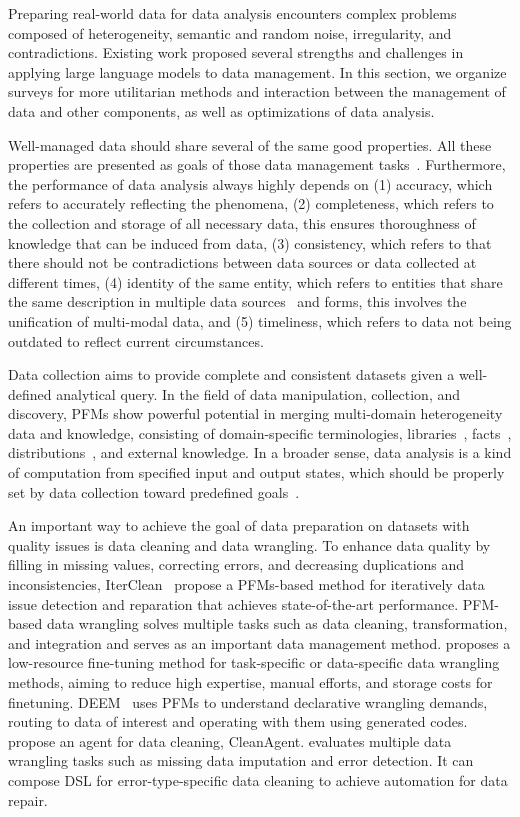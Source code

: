   Preparing real-world data for data analysis encounters complex problems composed of heterogeneity, semantic and random noise, irregularity, and contradictions. Existing work\cite{fernandez2023large} proposed several strengths and challenges in applying large language models to data management. In this section, we organize surveys for more utilitarian methods and interaction between the management of data and other components, as well as optimizations of data analysis. 
  
  
  Well-managed data should share several of the same good properties. All these properties are presented as goals of those data management tasks~\cite{wang1996beyond}. Furthermore, the performance of data analysis always highly depends on (1) accuracy, which refers to accurately reflecting the phenomena, (2) completeness, which refers to the collection and storage of all necessary data, this ensures thoroughness of knowledge that can be induced from data, (3) consistency, which refers to that there should not be contradictions between data sources or data collected at different times, (4) identity of the same entity, which refers to entities that share the same description in multiple data sources~\cite{khoshafian1986object} and forms, this involves the unification of multi-modal data, and (5) timeliness, which refers to data not being outdated to reflect current circumstances. 
  
  Data collection aims to provide complete and consistent datasets given a well-defined analytical query. In the field of data manipulation, collection, and discovery, PFMs show powerful potential in merging multi-domain heterogeneity data and knowledge, consisting of domain-specific terminologies, libraries~\cite{Ellis2020DreamCoderGG}, facts~\cite{Tang2024WorldCoderAM}, distributions~\cite{sordoni2024joint}, and external knowledge. In a broader sense, data analysis is a kind of computation from specified input and output states, which should be properly set by data collection toward predefined goals~\cite{turing1936computable}.
  
  
  An important way to achieve the goal of data preparation on datasets with quality issues is data cleaning and data wrangling. To enhance data quality by filling in missing values, correcting errors, and decreasing duplications and inconsistencies, IterClean~\cite{ni2024iterclean} propose a PFMs-based method for iteratively data issue detection and reparation that achieves state-of-the-art performance. PFM-based data wrangling solves multiple tasks such as data cleaning, transformation, and integration and serves as an important data management method. \cite{vos2022towards} proposes a low-resource fine-tuning method for task-specific or data-specific data wrangling methods, aiming to reduce high expertise, manual efforts, and storage costs for finetuning. DEEM~\cite{deem} uses PFMs to understand declarative wrangling demands, routing to data of interest and operating with them using generated codes. \cite{qi2024cleanagent} propose an agent for data cleaning, CleanAgent. \cite{FMwrangling} evaluates multiple data wrangling tasks such as missing data imputation and error detection. It can compose DSL for error-type-specific data cleaning to achieve automation for data repair.
  
